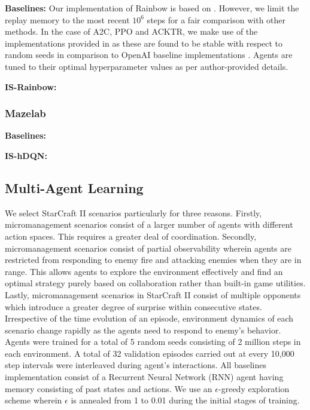 \documentclass{article}
\begin{document}
\textbf{Baselines:} Our implementation of Rainbow is based on \cite{curl}. However, we limit the replay memory to the most recent $10^{6}$ steps for a fair comparison with other methods. In the case of A2C, PPO and ACKTR, we make use of the implementations provided in \cite{kostrikov} as these are found to be stable with respect to random seeds in comparison to OpenAI baseline implementations \cite{baselines}. Agents are tuned to their optimal hyperparameter values as per author-provided details.

\textbf{IS-Rainbow:}

\subsubsection{Mazelab}
\textbf{Baselines:}

\textbf{IS-hDQN:}

\subsection{Multi-Agent Learning}
We select StarCraft II scenarios particularly for three reasons. Firstly, micromanagement scenarios consist of a larger number of agents with different action spaces. This requires a greater deal of coordination. Secondly, micromanagement scenarios consist of partial observability wherein agents are restricted from responding to enemy fire and attacking enemies when they are in range. This allows agents to explore the environment effectively and find an optimal strategy purely based on collaboration rather than built-in game utilities. Lastly, micromanagement scenarios in StarCraft II consist of multiple opponents which introduce a greater degree of surprise within consecutive states. Irrespective of the time evolution of an episode, environment dynamics of each scenario change rapidly as the agents need to respond to enemy's behavior. Agents were trained for a total of 5 random seeds consisting of 2 million steps in each environment. A total of 32 validation episodes carried out at every 10,000 step intervals were interleaved during agent's interactions. All baselines implementation consist of a Recurrent Neural Network (RNN) agent having memory consisting of past states and actions. We use an $\epsilon$-greedy exploration scheme wherein $\epsilon$ is annealed from 1 to 0.01 during the initial stages of training.\\
\end{document}
